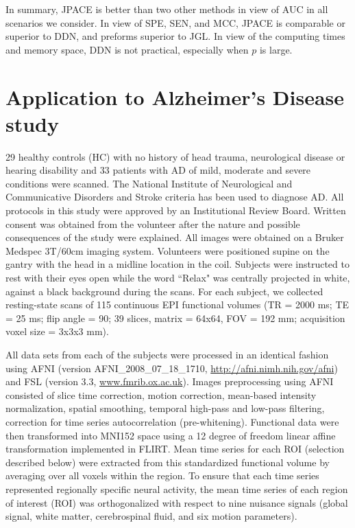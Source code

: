 \documentclass[useAMS,usenatbib,referee]{bio}
\begin{document}
{{In summary, JPACE is better than two other methods in view of AUC in all scenarios we consider. 
In view of SPE, SEN, and MCC, JPACE is comparable or superior to DDN, and preforms superior to JGL. In view of the computing times and memory space, DDN is not practical, especially when $p$ is large.


\section{Application to Alzheimer's Disease study}

29 healthy controls (HC) with no history of head trauma, neurological disease or hearing disability and 33 patients with AD of mild, moderate and severe conditions were scanned.
The National Institute of Neurological and Communicative Disorders and Stroke criteria \citep{McKhann} has been used to diagnose AD.
All protocols in this study were approved by an Institutional Review Board.
Written consent was obtained from the volunteer after the nature and possible consequences of the study were explained.
All images were obtained on a Bruker Medspec 3T/60cm imaging system.
Volunteers were positioned supine on the gantry with the head in a midline location in the coil.
Subjects were instructed to rest with their eyes open while the word ``Relax" was centrally projected in white, against a black background during the scans.
For each subject, we collected resting-state scans of 115 continuous EPI functional volumes (TR = 2000 ms; TE = 25 ms; flip angle = 90; 39 slices, matrix = 64x64, FOV = 192 mm; acquisition voxel size = 3x3x3 mm). 

All data sets from each of the subjects were processed in an identical fashion using AFNI (version AFNI\_2008\_07\_18\_1710, \url{http://afni.nimh.nih.gov/afni}) and FSL (version 3.3, \url{www.fmrib.ox.ac.uk}).
Images preprocessing using AFNI consisted of slice time correction, motion correction, mean-based intensity normalization, spatial smoothing, temporal high-pass and low-pass filtering, correction for time series autocorrelation (pre-whitening).
Functional data were then transformed into MNI152 space using a 12 degree of freedom linear affine transformation implemented in FLIRT.
Mean time series for each ROI (selection described below) were extracted from this standardized functional volume by averaging over all voxels within the region.
To ensure that each time series represented regionally specific neural activity, the mean time series of each region of interest (ROI) was orthogonalized with respect to nine nuisance signals (global signal, white matter, cerebrospinal fluid, and six motion parameters).


}}
\end{document}
